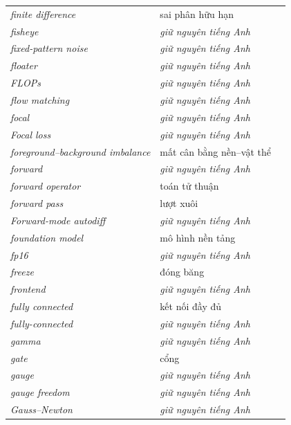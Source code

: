 \documentclass[deep_learning.tex]{subfiles}
\begin{document}
\begin{longtable}{@{}L{5.2cm}L{5.9cm}L{2.6cm}@{}}
\emph{finite difference} & sai phân hữu hạn & \\
\emph{fisheye} & \emph{\color{tiercol}giữ nguyên tiếng Anh} & \\
\emph{fixed-pattern noise} & \emph{\color{tiercol}giữ nguyên tiếng Anh} & \\
\emph{floater} & \emph{\color{tiercol}giữ nguyên tiếng Anh} & \\
\emph{FLOPs} & \emph{\color{tiercol}giữ nguyên tiếng Anh} & \\
\emph{flow matching} & \emph{\color{tiercol}giữ nguyên tiếng Anh} & \\
\emph{focal} & \emph{\color{tiercol}giữ nguyên tiếng Anh} & \\
\emph{Focal loss} & \emph{\color{tiercol}giữ nguyên tiếng Anh} & \\
\emph{foreground--background imbalance} & mất cân bằng nền--vật thể & \\
\emph{forward} & \emph{\color{tiercol}giữ nguyên tiếng Anh} & \\
\emph{forward operator} & toán tử thuận & \\
\emph{forward pass} & lượt xuôi & \\
\emph{Forward-mode autodiff} & \emph{\color{tiercol}giữ nguyên tiếng Anh} & \\
\emph{foundation model} & mô hình nền tảng & \\
\emph{fp16} & \emph{\color{tiercol}giữ nguyên tiếng Anh} & \\
\emph{freeze} & đóng băng & \\
\emph{frontend} & \emph{\color{tiercol}giữ nguyên tiếng Anh} & \\
\emph{fully connected} & kết nối đầy đủ & \\
\emph{fully-connected} & \emph{\color{tiercol}giữ nguyên tiếng Anh} & \\
\emph{gamma} & \emph{\color{tiercol}giữ nguyên tiếng Anh} & \\
\emph{gate} & cổng & \\
\emph{gauge} & \emph{\color{tiercol}giữ nguyên tiếng Anh} & \\
\emph{gauge freedom} & \emph{\color{tiercol}giữ nguyên tiếng Anh} & \\
\emph{Gauss--Newton} & \emph{\color{tiercol}giữ nguyên tiếng Anh} & \\

\end{longtable}
\end{document}
